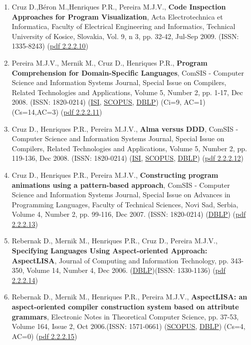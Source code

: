 \documentclass[11pt]{article}
\begin{document}
\begin{enumerate}
\item{ Cruz D.,Béron M.,Henriques P.R., Pereira M.J.V., {\bf{ Code Inspection Approaches for Program Visualization}}, Acta Electrotechnica et Informatica, Faculty of Electrical Engineering and Informatics, Technical University of Kosice, Slovakia, Vol. 9, n 3, pp. 32-42, Jul-Sep 2009. (ISSN: 1335-8243) (\href{run:Publicacoes/publicacoes/40.pdf}{pdf 2.2.2.10})}
\item{ Pereira M.J.V., Mernik M., Cruz D., Henriques P.R., {\bf{ Program Comprehension for Domain-Specific Languages}}, ComSIS - Computer Science and Information Systems Journal, Special Issue on Compilers, Related Technologies and Applications, Volume 5, Number 2, pp. 1-17, Dec 2008. (ISSN: 1820-0214) (\href{run:Publicacoes/ComprovativosISI.pdf}{ISI}, \href{run:Publicacoes/PublicacoesSCOPUS.pdf}{SCOPUS}, \href{run:Publicacoes/ComprovativosDBLP.pdf}{DBLP}) (Ci=9, AC=1) (Cs=14,AC=3) (\href{run:Publicacoes/publicacoes/33.pdf}{pdf 2.2.2.11})}
\item{ Cruz D., Henriques P.R., Pereira M.J.V., {\bf{ Alma versus DDD}}, ComSIS - Computer Science and Information Systems Journal, Special Issue on Compilers, Related Technologies and Applications, Volume 5, Number 2, pp. 119-136, Dec 2008. (ISSN: 1820-0214) (\href{run:Publicacoes/ComprovativosISI.pdf}{ISI}, \href{run:Publicacoes/PublicacoesSCOPUS.pdf}{SCOPUS}, \href{run:Publicacoes/ComprovativosDBLP.pdf}{DBLP}) (\href{run:Publicacoes/publicacoes/34.pdf}{pdf 2.2.2.12})}
\item{ Cruz D., Henriques P.R., Pereira M.J.V., {\bf{ Constructing program animations using a pattern-based approach}}, ComSIS - Computer Science and Information Systems Journal, Special Issue on Advances in Programming Languages, Faculty of Technical Sciences, Novi Sad, Serbia, Volume 4, Number 2, pp. 99-116, Dec 2007. (ISSN: 1820-0214) (\href{run:Publicacoes/ComprovativosDBLP.pdf}{DBLP}) (\href{run:Publicacoes/publicacoes/25.pdf}{pdf 2.2.2.13})}
\item{ Rebernak D., Mernik M., Henriques P.R., Cruz D., Pereira M.J.V., {\bf{ Specifying Languages Using Aspect-oriented Approach: AspectLISA}}, Journal of Computing and Information Technology, pp. 343-350, Volume 14, Number 4, Dec 2006. (\href{run:Publicacoes/ComprovativosDBLP.pdf}{DBLP})(ISSN: 1330-1136) (\href{run:Publicacoes/publicacoes/20.pdf}{pdf 2.2.2.14})}
\item{ Rebernak D., Mernik M., Henriques P.R., Pereira M.J.V., {\bf{ AspectLISA: an aspect-oriented compiler construction system based on attribute grammars}}, Electronic Notes in Theoretical Computer Science, pp. 37-53, Volume 164, Issue 2, Oct 2006.(ISSN: 1571-0661) (\href{run:Publicacoes/PublicacoesSCOPUS.pdf}{SCOPUS}, \href{run:Publicacoes/ComprovativosDBLP.pdf}{DBLP}) (Cs=4, AC=0) (\href{run:Publicacoes/publicacoes/14.pdf}{pdf 2.2.2.15})}

\end{enumerate}
\end{document}
